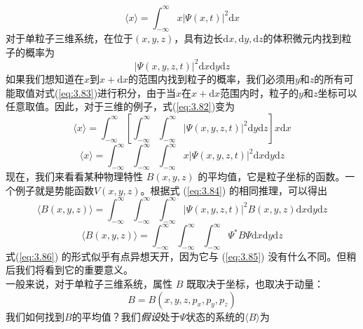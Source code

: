 	\begin{equation}
		\langle x \rangle = \int_{-\infty}^{\infty}x\left|\Psi\left(x,t\right)\right|^2\mathrm{d}x
		\label{eq:3.82}
	\end{equation}
	对于单粒子三维系统，在位于$\left(x,y,z\right)$，具有边长$\mathrm{d}x,\mathrm{d}y,\mathrm{d}z$的体积微元内找到粒子的概率为
	\begin{equation}
		\left|\Psi\left(x,y,z,t\right)\right|^2\mathrm{d}x\mathrm{d}y\mathrm{d}z
		\label{eq:3.83}
	\end{equation}
	如果我们想知道在$x$到$x+\mathrm{d}x$的范围内找到粒子的概率，我们必须用$y$和$z$的所有可能取值对式(\ref{eq:3.83})进行积分，由于当$x$在$x+\mathrm{d}x$范围内时，粒子的$y$和$z$坐标可以任意取值。因此，对于三维的例子，式(\ref{eq:3.82})变为
	\begin{equation}
		\langle x \rangle = \int_{-\infty}^{\infty}\left[\int_{-\infty}^{\infty}\int_{-\infty}^{\infty}\left|\Psi\left(x,y,z,t\right)\right|^2\mathrm{d}y\mathrm{d}z\right]x\mathrm{d}x
		\label{eq:3.84}
	\end{equation}
	\begin{equation*}
		\langle x \rangle = \int_{-\infty}^{\infty}\int_{-\infty}^{\infty}\int_{-\infty}^{\infty}x\left|\Psi\left(x,y,z,t\right)\right|^2\mathrm{d}x\mathrm{d}y\mathrm{d}z
	\end{equation*}
	\indent 现在，我们来看看某种物理特性 $B\left(x,y,z\right)$ 的平均值，它是粒子坐标的函数。一个例子就是势能函数$V\left(x,y,z\right)$。根据式 (\ref{eq:3.84}) 的相同推理，可以得出
	\begin{equation}
		\langle B\left(x,y,z\right) \rangle = \int_{-\infty}^{\infty}\int_{-\infty}^{\infty}\int_{-\infty}^{\infty}\left|\Psi\left(x,y,z,t\right)\right|^2B\left(x,y,z\right)\mathrm{d}x\mathrm{d}y\mathrm{d}z
		\label{eq:3.85}
	\end{equation}
	\begin{equation}
		\langle B\left(x,y,z\right) \rangle = \int_{-\infty}^{\infty}\int_{-\infty}^{\infty}\int_{-\infty}^{\infty}\Psi^{\ast}B\Psi\mathrm{d}x\mathrm{d}y\mathrm{d}z
		\label{eq:3.86}
	\end{equation}
	式(\ref{eq:3.86}) 的形式似乎有点异想天开，因为它与 (\ref{eq:3.85}) 没有什么不同。但稍后我们将看到它的重要意义。\\
	\indent 一般来说，对于单粒子三维系统，属性 $B$ 既取决于坐标，也取决于动量：
	\begin{equation*}
		B = B\left(x,y,z,p_x,p_y,p_z\right)
	\end{equation*}
	我们如何找到$B$的平均值？我们\textit{假设}处于$\Psi$状态的系统的$\langle B \rangle$为
